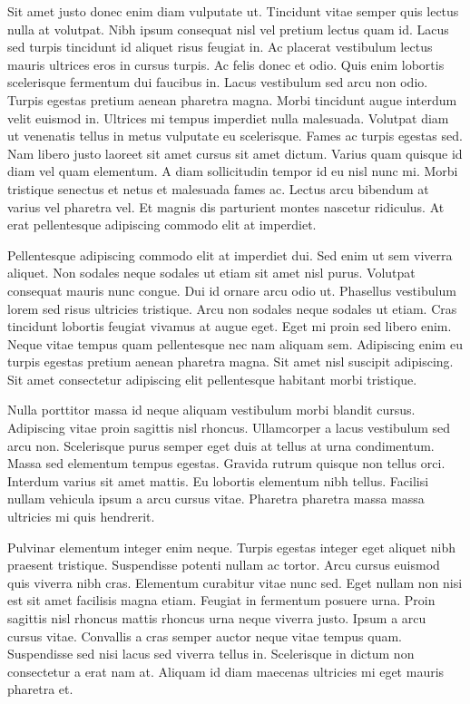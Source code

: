 \documentclass[12pt]{article}
\begin{document}
Sit amet justo donec enim diam vulputate ut. Tincidunt vitae semper quis lectus nulla at volutpat. Nibh ipsum consequat nisl vel pretium lectus quam id. Lacus sed turpis tincidunt id aliquet risus feugiat in. Ac placerat vestibulum lectus mauris ultrices eros in cursus turpis. Ac felis donec et odio. Quis enim lobortis scelerisque fermentum dui faucibus in. Lacus vestibulum sed arcu non odio. Turpis egestas pretium aenean pharetra magna. Morbi tincidunt augue interdum velit euismod in. Ultrices mi tempus imperdiet nulla malesuada. Volutpat diam ut venenatis tellus in metus vulputate eu scelerisque. Fames ac turpis egestas sed. Nam libero justo laoreet sit amet cursus sit amet dictum. Varius quam quisque id diam vel quam elementum. A diam sollicitudin tempor id eu nisl nunc mi. Morbi tristique senectus et netus et malesuada fames ac. Lectus arcu bibendum at varius vel pharetra vel. Et magnis dis parturient montes nascetur ridiculus. At erat pellentesque adipiscing commodo elit at imperdiet.

Pellentesque adipiscing commodo elit at imperdiet dui. Sed enim ut sem viverra aliquet. Non sodales neque sodales ut etiam sit amet nisl purus. Volutpat consequat mauris nunc congue. Dui id ornare arcu odio ut. Phasellus vestibulum lorem sed risus ultricies tristique. Arcu non sodales neque sodales ut etiam. Cras tincidunt lobortis feugiat vivamus at augue eget. Eget mi proin sed libero enim. Neque vitae tempus quam pellentesque nec nam aliquam sem. Adipiscing enim eu turpis egestas pretium aenean pharetra magna. Sit amet nisl suscipit adipiscing. Sit amet consectetur adipiscing elit pellentesque habitant morbi tristique.

Nulla porttitor massa id neque aliquam vestibulum morbi blandit cursus. Adipiscing vitae proin sagittis nisl rhoncus. Ullamcorper a lacus vestibulum sed arcu non. Scelerisque purus semper eget duis at tellus at urna condimentum. Massa sed elementum tempus egestas. Gravida rutrum quisque non tellus orci. Interdum varius sit amet mattis. Eu lobortis elementum nibh tellus. Facilisi nullam vehicula ipsum a arcu cursus vitae. Pharetra pharetra massa massa ultricies mi quis hendrerit.

Pulvinar elementum integer enim neque. Turpis egestas integer eget aliquet nibh praesent tristique. Suspendisse potenti nullam ac tortor. Arcu cursus euismod quis viverra nibh cras. Elementum curabitur vitae nunc sed. Eget nullam non nisi est sit amet facilisis magna etiam. Feugiat in fermentum posuere urna. Proin sagittis nisl rhoncus mattis rhoncus urna neque viverra justo. Ipsum a arcu cursus vitae. Convallis a cras semper auctor neque vitae tempus quam. Suspendisse sed nisi lacus sed viverra tellus in. Scelerisque in dictum non consectetur a erat nam at. Aliquam id diam maecenas ultricies mi eget mauris pharetra et.
\end{document}
